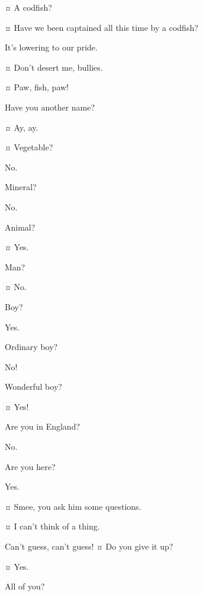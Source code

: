 \begin{drama}
\hookspeaks {}¤
A codfish?

\smeespeaks {}¤
Have we been captained all this time by a codfish?

\starkeyspeaks
It’s lowering to our pride.

\hookspeaks {}¤
Don’t desert me, bullies.

\peterspeaks {}¤
Paw, fish, paw!


\hookspeaks
Have you another name?

\peterspeaks {}¤
Ay, ay.

\hookspeaks {}¤
Vegetable?

\peterspeaks
No.

\hookspeaks
Mineral?

\peterspeaks
No.

\hookspeaks
Animal?

\peterspeaks {}¤
Yes.

\hookspeaks
Man?

\peterspeaks {}¤
No.

\hookspeaks
Boy?

\peterspeaks
Yes.

\hookspeaks
Ordinary boy?

\peterspeaks
No!

\hookspeaks
Wonderful boy?

\peterspeaks {}¤
Yes!

\hookspeaks
Are you in England?

\peterspeaks
No.

\hookspeaks
Are you here?

\peterspeaks
Yes.

\hookspeaks {}¤
Smee, you ask him some questions.

\smeespeaks {}¤
I can’t think of a thing.

\peterspeaks
Can’t guess, can’t guess!
¤
Do you give it up?

\hookspeaks {}¤
Yes.

\peterspeaks
All of you?


\end{drama}

